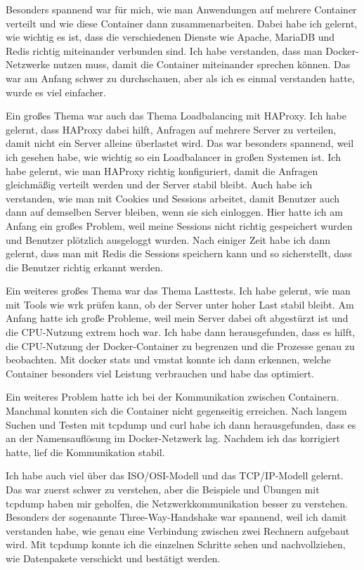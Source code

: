 Besonders spannend war für mich, wie man Anwendungen auf mehrere Container verteilt und wie diese Container dann zusammenarbeiten. Dabei habe ich gelernt, wie wichtig es ist, dass die verschiedenen Dienste wie Apache, MariaDB und Redis richtig miteinander verbunden sind. Ich habe verstanden, dass man Docker-Netzwerke nutzen muss, damit die Container miteinander sprechen können. Das war am Anfang schwer zu durchschauen, aber als ich es einmal verstanden hatte, wurde es viel einfacher.

Ein großes Thema war auch das Thema Loadbalancing mit HAProxy. Ich habe gelernt, dass HAProxy dabei hilft, Anfragen auf mehrere Server zu verteilen, damit nicht ein Server alleine überlastet wird. Das war besonders spannend, weil ich gesehen habe, wie wichtig so ein Loadbalancer in großen Systemen ist. Ich habe gelernt, wie man HAProxy richtig konfiguriert, damit die Anfragen gleichmäßig verteilt werden und der Server stabil bleibt. Auch habe ich verstanden, wie man mit Cookies und Sessions arbeitet, damit Benutzer auch dann auf demselben Server bleiben, wenn sie sich einloggen. Hier hatte ich am Anfang ein großes Problem, weil meine Sessions nicht richtig gespeichert wurden und Benutzer plötzlich ausgeloggt wurden. Nach einiger Zeit habe ich dann gelernt, dass man mit Redis die Sessions speichern kann und so sicherstellt, dass die Benutzer richtig erkannt werden.

Ein weiteres großes Thema war das Thema Lasttests. Ich habe gelernt, wie man mit Tools wie wrk prüfen kann, ob der Server unter hoher Last stabil bleibt. Am Anfang hatte ich große Probleme, weil mein Server dabei oft abgestürzt ist und die CPU-Nutzung extrem hoch war. Ich habe dann herausgefunden, dass es hilft, die CPU-Nutzung der Docker-Container zu begrenzen und die Prozesse genau zu beobachten. Mit docker stats und vmstat konnte ich dann erkennen, welche Container besonders viel Leistung verbrauchen und habe das optimiert.

Ein weiteres Problem hatte ich bei der Kommunikation zwischen Containern. Manchmal konnten sich die Container nicht gegenseitig erreichen. Nach langem Suchen und Testen mit tcpdump und curl habe ich dann herausgefunden, dass es an der Namensauflösung im Docker-Netzwerk lag. Nachdem ich das korrigiert hatte, lief die Kommunikation stabil.

Ich habe auch viel über das ISO/OSI-Modell und das TCP/IP-Modell gelernt. Das war zuerst schwer zu verstehen, aber die Beispiele und Übungen mit tcpdump haben mir geholfen, die Netzwerkkommunikation besser zu verstehen. Besonders der sogenannte Three-Way-Handshake war spannend, weil ich damit verstanden habe, wie genau eine Verbindung zwischen zwei Rechnern aufgebaut wird. Mit tcpdump konnte ich die einzelnen Schritte sehen und nachvollziehen, wie Datenpakete verschickt und bestätigt werden.

